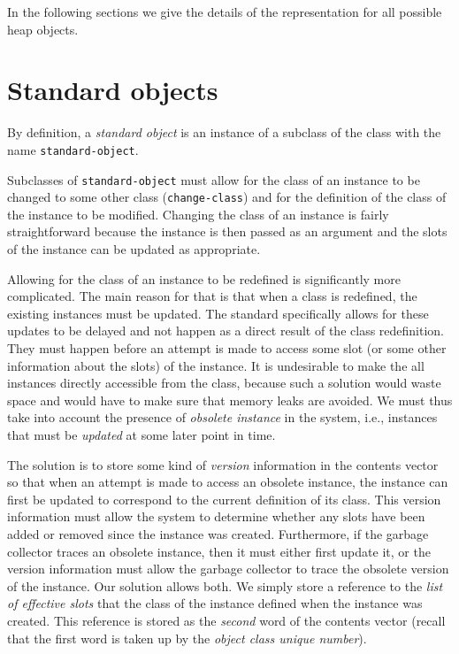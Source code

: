 In the following sections we give the details of the representation
for all possible heap objects.

\section{Standard objects}
\label{sec-data-representation-standard-objects}

By definition, a \emph{standard object} is an instance of a subclass
of the class with the name \texttt{standard-object}.

Subclasses of \texttt{standard-object} must allow for the class of an
instance to be changed to some other class (\texttt{change-class}) and
for the definition of the class of the instance to be modified.
Changing the class of an instance is fairly straightforward because
the instance is then passed as an argument and the slots of the
instance can be updated as appropriate.

Allowing for the class of an instance to be redefined is significantly
more complicated.  The main reason for that is that when a class is
redefined, the existing instances must be updated.  The standard
specifically allows for these updates to be delayed and not happen as
a direct result of the class redefinition.  They must happen before an
attempt is made to access some slot (or some other information about
the slots) of the instance.  It is undesirable to make the all
instances directly accessible from the class, because such a solution
would waste space and would have to make sure that memory leaks are
avoided.  We must thus take into account the presence of
\emph{obsolete instance} in the system, i.e., instances that must be
\emph{updated} at some later point in time. 

The solution is to store some kind of \emph{version} information in
the contents vector so that when an attempt is made to access an
obsolete instance, the instance can first be updated to correspond to
the current definition of its class.  This version information must
allow the system to determine whether any slots have been added or
removed since the instance was created.  Furthermore, if the garbage
collector traces an obsolete instance, then it must either first
update it, or the version information must allow the garbage collector
to trace the obsolete version of the instance.  Our solution allows
both.  We simply store a reference to the \emph{list of effective
  slots} that the class of the instance defined when the instance was
created.  This reference is stored as the \emph{second} word of the
contents vector (recall that the first word is taken up by the
\emph{object class unique
  number}).  

